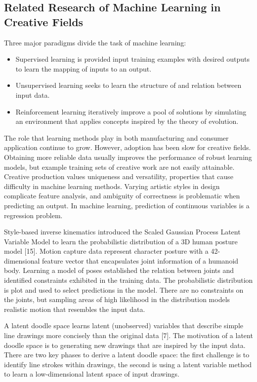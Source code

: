 \documentclass[a4paper, fontsize=15pt, onecolumn]{article} %
\numberwithin{equation}{section} %
\numberwithin{figure}{section} %
\numberwithin{table}{section} %
\begin{document}
\subsection{Related Research of Machine Learning in Creative Fields}
Three major paradigms divide the task of machine learning:
\begin{itemize}
	\item Supervised learning is provided input training examples with desired outputs to learn the mapping of inputs to an output.
	\item Unsupervised learning seeks to learn the structure of and relation between input data.
	\item Reinforcement learning iteratively improve a pool of solutions by simulating an environment that applies concepts inspired by the theory of evolution.
\end{itemize}
The role that learning methods play in both manufacturing and consumer application continue to grow. However, adoption has been slow for creative fields. Obtaining more reliable data usually improves the performance of robust learning models, but example training sets of creative work are not easily attainable. Creative production values uniqueness and versatility, properties that cause difficulty in machine learning methods. Varying artistic styles in design complicate feature analysis, and ambiguity of correctness is problematic when predicting an output. In machine learning, prediction of continuous variables is a regression problem.

Style-based inverse kinematics introduced the Scaled Gaussian Process Latent Variable Model to learn the probabilistic distribution of a 3D human posture model [15]. Motion capture data represent character posture with a 42-dimensional feature vector that encapsulates joint information of a humanoid body. Learning a model of poses established the relation between joints and identified constraints exhibited in the training data. The probabilistic distribution is plot and used to select predictions in the model. There are no constraints on the joints, but sampling areas of high likelihood in the distribution models realistic motion that resembles the input data.

A latent doodle space learns latent (unobserved) variables that describe simple line drawings more concisely than the original data [7]. The motivation of a latent doodle space is to generating new drawings that are inspired by the input data. There are two key phases to derive a latent doodle space: the first challenge is to identify line strokes within drawings, the second is using a latent variable method to learn a low-dimensional latent space of input drawings. 
\end{document}
